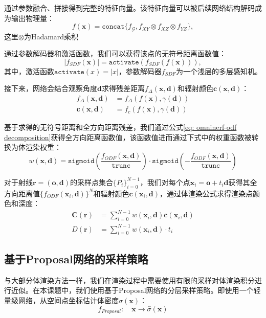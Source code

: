 通过参数融合、拼接得到完整的特征向量。该特征向量可以被后续网络结构解码成为输出物理量：
\begin{equation}
    f(\mathbf{x}) = \mathtt{concat}\{f_{\mathcal{G}}, f_{XY}\otimes f_{XZ} \otimes f_{YZ}\},
\end{equation}
这里$\otimes$为Hadamard乘积\cite{fridovich-keil_k-planes_2023}

通过参数解码器和激活函数，我们可以获得该点的无符号距离函数值：
\begin{equation}
    |f_{SDF}(\mathbf{x})| = \mathtt{activate}(f_{SDF}(f(\mathbf{x}))),
\end{equation}
其中，激活函数$\mathtt{activate}(x)=|x|$，参数解码器$f_{SDF}$为一个浅层的多层感知机。

接下来，网络会结合观察角度$\mathbf{d}$求得残差距离$f_\Delta(\mathbf{x}, \mathbf{d})$和辐射颜色$\mathbf{c}(\mathbf{x},\mathbf{d})$：
\begin{align}
    f_\Delta(\mathbf{x}, \mathbf{d})&=f_\Delta(f(\mathbf{x}), \gamma(\mathbf{d}))\\
    \mathbf{c}(\mathbf{x},\mathbf{d}) &=f_c(f(\mathbf{x}), \gamma(\mathbf{d}))
\end{align}

基于求得的无符号距离和全方向距离残差，我们通过公式\ref{eq: omninerf-odf decomposition}获得全方向距离函数值，该函数值进而通过下式中的权重函数被转换为体渲染权重：
\begin{equation}
    w(\mathbf{x},\mathbf{d}) = \mathtt{sigmoid}\left(\frac{f_{ODF}(\mathbf{x},\mathbf{d})}{\mathtt{trunc}}\right)\cdot\mathtt{sigmoid}\left(-\frac{f_{ODF}(\mathbf{x},\mathbf{d})}{\mathtt{trunc}}\right)
\end{equation}

对于射线$\mathbf{r} = (\mathbf{o},\mathbf{d})$的采样点集合$\{P_i\}_{i=0}^{N-1}$，我们对每个点$\mathbf{x}_i=\mathbf{o}+t_i\mathbf{d}$获得其全方向距离值$\{f_{ODF}(\mathbf{x}_i,\mathbf{d})\}^N$和辐射颜色$\mathbf{c}(\mathbf{x}_i,\mathbf{d})$，通过体渲染公式求得渲染点颜色和深度：
\begin{align}
    \mathbf{C}(\mathbf{r}) &= \sum_{i=0}^{N-1}w(\mathbf{x}_i,\mathbf{d})\mathbf{c}(\mathbf{x}_i,\mathbf{d})\\
    D(\mathbf{r}) &= \sum_{i=0}^{N-1}w(\mathbf{x}_i,\mathbf{d})\cdot t_i
\end{align}

\subsection{基于Proposal网络的采样策略}
与大部分体渲染方法一样，我们在渲染过程中需要使用有限的采样对体渲染积分进行近似。在本课题中，我们使用基于Proposal网络的分层采样策略。即使用一个轻量级网络，从空间点坐标估计体密度$\hat{\sigma}(\mathbf{x})$：
\begin{equation}
    f_{Proposal}:\quad \mathbf{x}\to\hat{\sigma}(\mathbf{x})
\end{equation}

